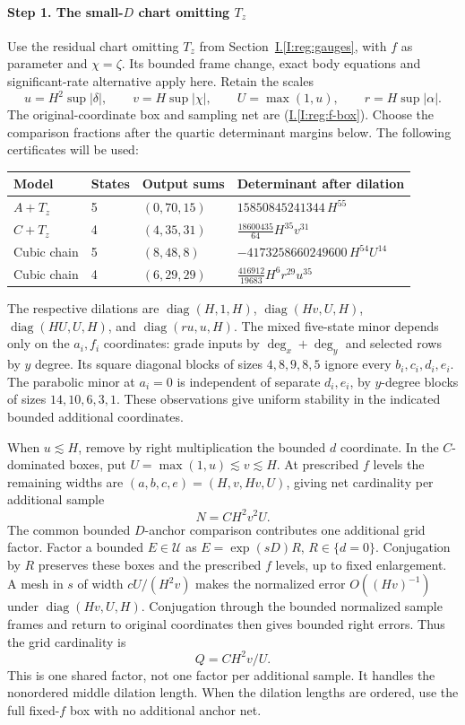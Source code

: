 \documentclass[11pt]{amsart}
\theoremstyle{definition}
\theoremstyle{remark}
\DeclareMathOperator{\diag}{diag}
\numberwithin{equation}{section}
\newcommand{\partIref}[1]{\hyperref[I:#1]{I.\ref*{I:#1}}}
\newcommand{\partIeqref}[1]{\textup{(\partIref{#1})}}
\begin{document}
\paragraph{Step 1. \texorpdfstring{The small-$D$ chart omitting $T_z$}{The small-D chart omitting Tz}}
Use the residual chart omitting $T_z$ from Section~\partIref{reg:gauges}, with $f$ as parameter and $\chi=\zeta$. Its bounded frame change, exact body equations and significant-rate alternative apply here. Retain the scales
\[
u=H^2\sup|\delta|,\qquad v=H\sup|\chi|,\qquad U=\max(1,u),\qquad r=H\sup|\alpha|.
\]
The original-coordinate box and sampling net are \partIeqref{reg:f-box}. Choose the comparison fractions after the quartic determinant margins below.
The following certificates will be used:
\begin{center}\small
\begin{tabular}{llll}
\toprule
Model & States & Output sums & Determinant after dilation\\
\midrule
$A+T_z$ &5&$(0,70,15)$&$15850845241344\,H^{55}$\\
$C+T_z$ &4&$(4,35,31)$&$\frac{18600435}{64}H^{35}v^{31}$\\
Cubic chain &5&$(8,48,8)$&$-4173258660249600\,H^{54}U^{14}$\\
Cubic chain &4&$(6,29,29)$&$\frac{416912}{19683}H^6r^{29}u^{35}$\\
\bottomrule
\end{tabular}
\end{center}
The respective dilations are $\diag(H,1,H)$, $\diag(Hv,U,H)$, $\diag(HU,U,H)$, and $\diag(ru,u,H)$. The mixed five-state minor depends only on the $a_i,f_i$ coordinates: grade inputs by $\deg_x+\deg_y$ and selected rows by $y$ degree. Its square diagonal blocks of sizes $4,8,9,8,5$ ignore every $b_i,c_i,d_i,e_i$. The parabolic minor at $a_i=0$ is independent of separate $d_i,e_i$, by $y$-degree blocks of sizes $14,10,6,3,1$. These observations give uniform stability in the indicated bounded additional coordinates.

When $u\lesssim H$, remove by right multiplication the bounded $d$ coordinate. In the $C$-dominated boxes, put $U=\max(1,u)\lesssim v\lesssim H$. At prescribed $f$ levels the remaining widths are $(a,b,c,e)=(H,v,Hv,U)$, giving net cardinality per additional sample
\begin{equation}\label{low:4:rr:fwitness}
N=CH^2v^2U.
\end{equation}
The common bounded $D$-anchor comparison contributes one additional grid factor. Factor a bounded $E\in\mathcal U$ as $E=\exp(sD)R$, $R\in\{d=0\}$. Conjugation by $R$ preserves these boxes and the prescribed $f$ levels, up to fixed enlargement. A mesh in $s$ of width $cU/(H^2v)$ makes the normalized error $O((Hv)^{-1})$ under $\diag(Hv,U,H)$. Conjugation through the bounded normalized sample frames and return to original coordinates then gives bounded right errors. Thus the grid cardinality is
\begin{equation}\label{low:4:rr:dcost}
Q=CH^2v/U.
\end{equation}
This is one shared factor, not one factor per additional sample. It handles the nonordered middle dilation length. When the dilation lengths are ordered, use the full fixed-$f$ box with no additional anchor net.
\end{document}

